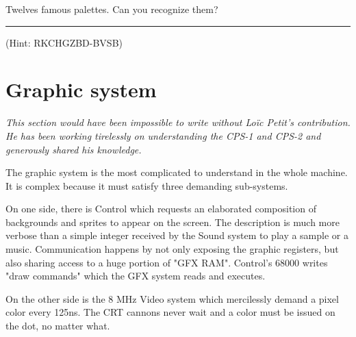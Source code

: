 Twelves famous palettes. Can you recognize them?









\par\noindent\rule{\textwidth}{0.4pt}





 (Hint: RKCHGZBD-BVSB)














\section{Graphic system}

\emph{This section would have been impossible to write without Lo\"{i}c Petit's contribution. He has been working tirelessly on understanding the CPS-1 and CPS-2 and generously shared his knowledge.}

The graphic system is the most complicated to understand in the whole machine. It is complex because it must satisfy three demanding sub-systems.

On one side, there is Control which requests an elaborated composition of backgrounds and sprites to appear on the screen. The description is much more verbose than a simple integer received by the Sound system to play a sample or a music. Communication happens by not only exposing the graphic registers, but also sharing access to a huge portion of "GFX RAM". Control's 68000 writes "draw commands" which the GFX system reads and executes.

On the other side is the 8 MHz Video system which mercilessly demand a pixel color every 125ns. The CRT cannons never wait and a color must be issued on the dot, no matter what. 

